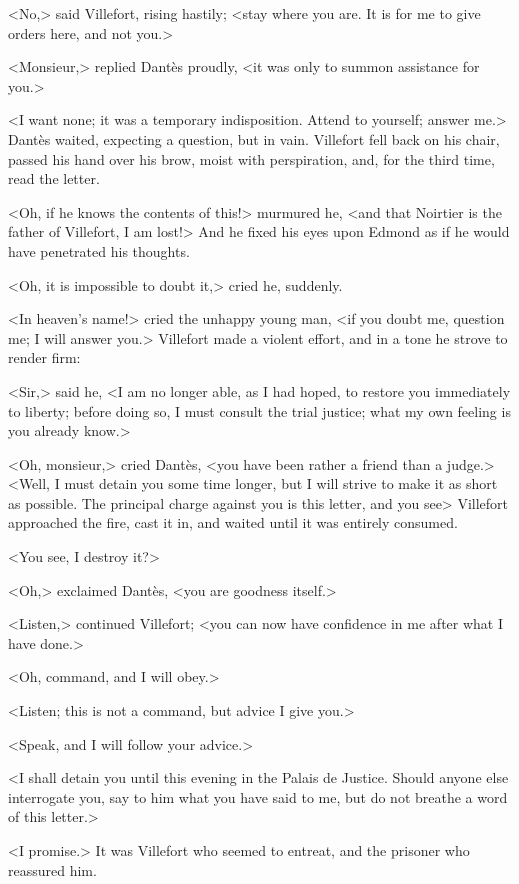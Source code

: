  <No,> said Villefort, rising hastily; <stay where you are. It is for me to give orders here, and not you.> 

 <Monsieur,> replied Dantès proudly, <it was only to summon assistance for you.> 

 <I want none; it was a temporary indisposition. Attend to yourself; answer me.> Dantès waited, expecting a question, but in vain. Villefort fell back on his chair, passed his hand over his brow, moist with perspiration, and, for the third time, read the letter. 

 <Oh, if he knows the contents of this!> murmured he, <and that Noirtier is the father of Villefort, I am lost!> And he fixed his eyes upon Edmond as if he would have penetrated his thoughts. 

 <Oh, it is impossible to doubt it,> cried he, suddenly. 

 <In heaven's name!> cried the unhappy young man, <if you doubt me, question me; I will answer you.> Villefort made a violent effort, and in a tone he strove to render firm: 

 <Sir,> said he, <I am no longer able, as I had hoped, to restore you immediately to liberty; before doing so, I must consult the trial justice; what my own feeling is you already know.> 

 <Oh, monsieur,> cried Dantès, <you have been rather a friend than a judge.>  <Well, I must detain you some time longer, but I will strive to make it as short as possible. The principal charge against you is this letter, and you see\longdash> Villefort approached the fire, cast it in, and waited until it was entirely consumed. 

 <You see, I destroy it?> 

 <Oh,> exclaimed Dantès, <you are goodness itself.> 

 <Listen,> continued Villefort; <you can now have confidence in me after what I have done.> 

 <Oh, command, and I will obey.> 

 <Listen; this is not a command, but advice I give you.> 

 <Speak, and I will follow your advice.> 

 <I shall detain you until this evening in the Palais de Justice. Should anyone else interrogate you, say to him what you have said to me, but do not breathe a word of this letter.> 

 <I promise.> It was Villefort who seemed to entreat, and the prisoner who reassured him. 

